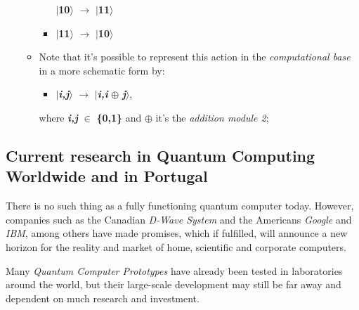 \documentclass[conference]{IEEEtran}
\begin{document}
\begin{itemize}
\begin{itemize}
\begin{itemize}
                    \begin{center}
                        $\mid$\textbf{10}$\rangle$ $\rightarrow$ $\mid$\textbf{11}$\rangle$
                    \end{center} 
                \item 
                    \begin{center}
                        $\mid$\textbf{11}$\rangle$ $\rightarrow$ $\mid$\textbf{10}$\rangle$
                    \end{center}
            \end{itemize}
           \newpage
           \item Note that it's possible to represent this action in the \textit{computational base} in a more schematic form by:
            \begin{itemize}
                \item 
                    \begin{center}
                        $\mid$\textit{\textbf{i,j}}$\rangle$ $\rightarrow$ $\mid$\textit{\textbf{i,i}} $\oplus$ \textit{\textbf{j}}$\rangle$,\\
                    \end{center}
            \end{itemize}
            \vspace{4pt} 
            where \textit{\textbf{i,j}} $\in$ \textbf{\{0,1\}} and $\oplus$ it's the \textit{addition module 2};
    \end{itemize}
\end{itemize}

\vspace{6pt}

\subsection{Current research in Quantum Computing Worldwide and in Portugal}\label{AA}

There is no such thing as a fully functioning quantum computer today. However, companies such as the Canadian \textit{D-Wave System} and the Americans \textit{Google} and \textit{IBM}, among others have made promises, which if fulfilled, will announce a new horizon for the reality and market of home, scientific and corporate computers.

\vspace{4pt}

Many \textit{Quantum Computer Prototypes} have already been tested in laboratories around the world, but their large-scale development may still be far away and dependent on much research and investment.
\end{document}
